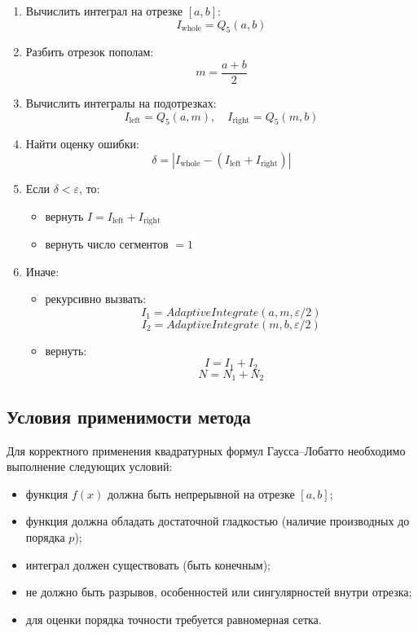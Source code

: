\documentclass[14pt]{extarticle}
\begin{document}
	\begin{enumerate}
		\item Вычислить интеграл на отрезке $[a,b]$:
		\[
		I_{\text{whole}} = Q_5(a,b)
		\]
		
		\item Разбить отрезок пополам:
		\[
		m = \frac{a+b}{2}
		\]
		
		\item Вычислить интегралы на подотрезках:
		\[
		I_{\text{left}} = Q_5(a,m), \quad I_{\text{right}} = Q_5(m,b)
		\]
		
		\item Найти оценку ошибки:
		\[
		\delta = |I_{\text{whole}} - (I_{\text{left}} + I_{\text{right}})|
		\]
		
		\item Если $\delta < \varepsilon$, то:
		\begin{itemize}
			\item вернуть $I = I_{\text{left}} + I_{\text{right}}$
			\item вернуть число сегментов $=1$
		\end{itemize}
		
		\item Иначе:
		\begin{itemize}
			\item рекурсивно вызвать:
			\[
			I_1 = AdaptiveIntegrate(a, m, \varepsilon/2)
			\]
			\[
			I_2 = AdaptiveIntegrate(m, b, \varepsilon/2)
			\]
			
			\item вернуть:
			\[
			I = I_1 + I_2
			\]
			\[
			N = N_1 + N_2
			\]
		\end{itemize}
		
	\end{enumerate}
	
	\subsection{Условия применимости метода}
	
	Для корректного применения квадратурных формул Гаусса–Лобатто необходимо выполнение следующих условий:
	
	\begin{itemize}
		\item функция $f(x)$ должна быть непрерывной на отрезке $[a,b]$;
		\item функция должна обладать достаточной гладкостью (наличие производных до порядка $p$);
		\item интеграл должен существовать (быть конечным);
		\item не должно быть разрывов, особенностей или сингулярностей внутри отрезка;
		\item для оценки порядка точности требуется равномерная сетка.
	\end{itemize}
	
\end{document}
